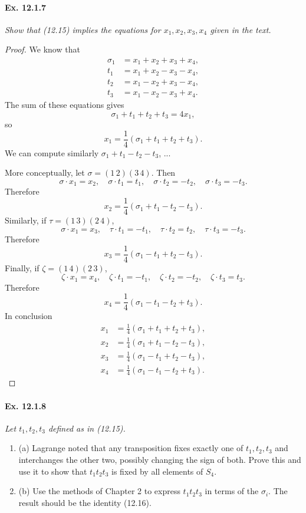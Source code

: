 \documentclass[11pt,a4paper]{article}
\newcommand{\be} {\begin{enumerate}}
\newcommand{\ee} {\end{enumerate}}
\begin{document}
\paragraph{Ex. 12.1.7}

{\it Show that (12.15) implies the equations for $x_1,x_2,x_3,x_4$ given in the text.
}

\begin{proof}
We know that
\begin{align*}
\sigma_1 &= x_1+x_2+x_3+x_4,\\
t_1 &= x_1+x_2-x_3-x_4,\\
t_2 &= x_1-x_2+x_3-x_4,\\
t_3 &= x_1-x_2-x_3+x_4.
\end{align*}
The sum of these equations gives
$$\sigma_1 + t_1 + t_2 + t_3 = 4x_1,$$
so
$$x_1=\frac{1}{4} \left(\sigma_1 + t_1 + t_2 + t_3 \right).$$
We can compute similarly $\sigma_1+t_1-t_2-t_3$, ...

More conceptually, let $\sigma = (1\,2)(3\,4)$. Then 
$$\sigma \cdot x_1 = x_2,\quad  \sigma \cdot t_1 = t_1,\quad  \sigma \cdot t_2 = -t_2,\quad \sigma \cdot t_3 = -t_3.$$
Therefore 
$$x_2 = \frac{1}{4} \left(\sigma_1 + t_1 - t_2 - t_3 \right).$$
Similarly, if $\tau = (1\,3)(2\,4)$,
$$\sigma \cdot x_1 = x_3,\quad  \tau \cdot t_1 = -t_1,\quad  \tau \cdot t_2 = t_2,\quad \tau \cdot t_3 = -t_3.$$
Therefore 
$$x_3 = \frac{1}{4} \left(\sigma_1 - t_1 + t_2 - t_3 \right).$$
Finally, if $\zeta = (1\,4)(2\,3)$,
$$\zeta \cdot x_1 = x_4,\quad  \zeta \cdot t_1 = -t_1,\quad  \zeta \cdot t_2 = -t_2,\quad \zeta \cdot t_3 = t_3.$$
Therefore 
$$x_4 = \frac{1}{4} \left(\sigma_1 - t_1 - t_2 + t_3 \right).$$
In conclusion
\begin{align*}
x_1 &=\frac{1}{4} \left(\sigma_1 + t_1 + t_2 + t_3 \right),\\
x_2 &= \frac{1}{4} \left(\sigma_1 + t_1 - t_2 - t_3 \right),\\
x_3 &= \frac{1}{4} \left(\sigma_1 - t_1 + t_2 - t_3 \right),\\
x_4 &= \frac{1}{4} \left(\sigma_1 - t_1 - t_2 + t_3 \right).
\end{align*}
\end{proof}

\paragraph{Ex. 12.1.8}

{\it Let $t_1,t_2,t_3$ defined as in (12.15).
\be
\item[(a)]
Lagrange noted that any transposition fixes exactly one of $t_1,t_2,t_3$ and interchanges the other two, possibly changing the sign of both. Prove this and use it to show that $t_1t_2t_3$ is fixed by all elements of $S_4$.
\item[(b)]
Use the methods of Chapter 2 to express $t_1t_2t_3$ in terms of the $\sigma_i$. The result should be the identity (12.16).
\ee
}
\end{document}
